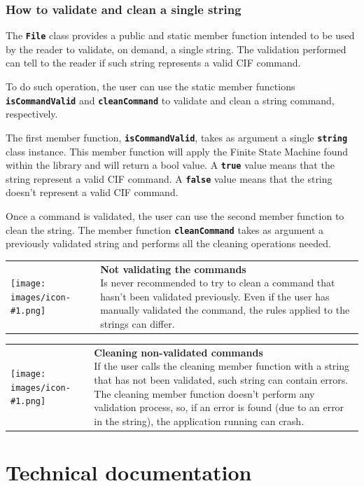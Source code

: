 \documentclass[11pt,twoside,openany,x11names,svgnames]{memoir}
\makeatletter
\newcommand\chapterillustration{}
\newcommand{\IconNote}[3]
{
	\begin{table}[ht]
	\begin{tabular}{ lm{\dimexpr\textwidth-8\tabcolsep-\wd0}@{}}
		\toprule
		\texttt{[image: images/icon-\#1.png]}
		&
		\parbox[t]{155mm}{
		\textbf{#2} \\
		#3
		}
	\end{tabular}
\end{table}
}
\makeatother
\begin{document}
\subsection{How to validate and clean a single string}

The \textbf{\texttt{File}} class provides a public and static member function intended to be used by the reader to validate, on demand, a single string. The validation performed can tell to the reader if such string represents a valid CIF command.

To do such operation, the user can use the static member functions \textbf{\texttt{isCommandValid}} and \textbf{\texttt{cleanCommand}} to validate and clean a string command, respectively.

The first member function, \textbf{\texttt{isCommandValid}}, takes as argument a single \textbf{\texttt{string}} class instance. This member function will apply the Finite State Machine found within the library and will return a bool value. A \textbf{\texttt{true}} value means that the string represent a valid CIF command. A \textbf{\texttt{false}} value means that the string doesn't represent a valid CIF command.

Once a command is validated, the user can use the second member function to clean the string. The member function \textbf{\texttt{cleanCommand}} takes as argument a previously validated string and performs all the cleaning operations needed.

\IconNote
	{warning}
	{Not validating the commands}
	{Is never recommended to try to clean a command that hasn't been validated previously. Even if the user has manually validated the command, the rules applied to the strings can differ.}
	
\IconNote
	{error}
	{Cleaning non-validated commands}
	{If the user calls the cleaning member function with a string that has not been validated, such string can contain errors. The cleaning member function doesn't perform any validation process, so, if an error is found (due to an error in the string), the application running can crash.}

\renewcommand\chapterillustration{images/chapter03-cover}
\chapter{Technical documentation}\label{Technical-documentation}
\end{document}
